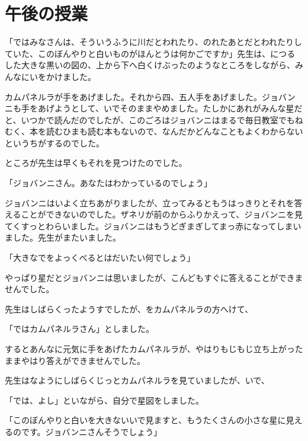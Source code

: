 

\chapter{午後の授業}

「ではみなさんは、そういうふうに川だとわれたり、のれたあとだとわれたりしていた、このぼんやりと白いものがほんとうは何かごですか」先生は、につるした大きな黒いの図の、上から下へ白くけぶったのようなところをしながら、みんなにいをかけました。

カムパネルラが手をあげました。それから四、五人手をあげました。ジョバンニも手をあげようとして、いでそのままやめました。たしかにあれがみんな星だと、いつかで読んだのでしたが、このごろはジョバンニはまるで毎日教室でもねむく、本を読むひまも読む本もないので、なんだかどんなこともよくわからないというちがするのでした。

ところが先生は早くもそれを見つけたのでした。

「ジョバンニさん。あなたはわかっているのでしょう」

ジョバンニはいよく立ちあがりましたが、立ってみるともうはっきりとそれを答えることができないのでした。ザネリが前のからふりかえって、ジョバンニを見てくすっとわらいました。ジョバンニはもうどぎまぎしてまっ赤になってしまいました。先生がまたいました。

「大きなでをよっくべるとはだいたい何でしょう」

やっぱり星だとジョバンニは思いましたが、こんどもすぐに答えることができませんでした。

先生はしばらくったようすでしたが、をカムパネルラの方へけて、

「ではカムパネルラさん」としました。

するとあんなに元気に手をあげたカムパネルラが、やはりもじもじ立ち上がったままやはり答えができませんでした。

先生はなようにしばらくじっとカムパネルラを見ていましたが、いで、

「では、よし」といながら、自分で星図をしました。

「このぼんやりと白いを大きないいで見ますと、もうたくさんの小さな星に見えるのです。ジョバンニさんそうでしょう」

